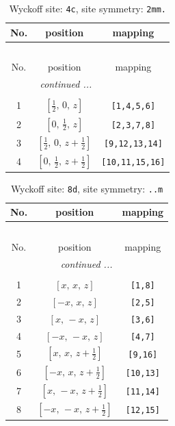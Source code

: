 \documentclass[fleqn,8pt]{jsarticle}
\begin{document}
\renewcommand{\arraystretch}{1.2}
\begin{longtable}{ccc}
\caption{Wyckoff site: {\tt 4c}, site symmetry: {\tt 2mm.}}
 \\
 \hline \hline
No. & position & mapping \\ \hline \endfirsthead

\multicolumn{2}{l}{\tablename\ \thetable{}} \\
 \hline \hline
No. & position & mapping \\ \hline \endhead

 \hline \hline
\multicolumn{2}{r}{\footnotesize\it continued ...} \\ \endfoot

 \hline \hline
\multicolumn{2}{r}{} \\ \endlastfoot

1 & $\left[ \frac{1}{2},\, 0,\, z \right]$ & {\tt [1,4,5,6]} \\ \hline
2 & $\left[ 0,\, \frac{1}{2},\, z \right]$ & {\tt [2,3,7,8]} \\ \hline
3 & $\left[ \frac{1}{2},\, 0,\, z + \frac{1}{2} \right]$ & {\tt [9,12,13,14]} \\ \hline
4 & $\left[ 0,\, \frac{1}{2},\, z + \frac{1}{2} \right]$ & {\tt [10,11,15,16]} \\
\end{longtable}
\renewcommand{\arraystretch}{1.2}
\begin{longtable}{ccc}
\caption{Wyckoff site: {\tt 8d}, site symmetry: {\tt ..m}}
 \\
 \hline \hline
No. & position & mapping \\ \hline \endfirsthead

\multicolumn{2}{l}{\tablename\ \thetable{}} \\
 \hline \hline
No. & position & mapping \\ \hline \endhead

 \hline \hline
\multicolumn{2}{r}{\footnotesize\it continued ...} \\ \endfoot

 \hline \hline
\multicolumn{2}{r}{} \\ \endlastfoot

1 & $\left[ x,\, x,\, z \right]$ & {\tt [1,8]} \\ \hline
2 & $\left[ - x,\, x,\, z \right]$ & {\tt [2,5]} \\ \hline
3 & $\left[ x,\, - x,\, z \right]$ & {\tt [3,6]} \\ \hline
4 & $\left[ - x,\, - x,\, z \right]$ & {\tt [4,7]} \\ \hline
5 & $\left[ x,\, x,\, z + \frac{1}{2} \right]$ & {\tt [9,16]} \\ \hline
6 & $\left[ - x,\, x,\, z + \frac{1}{2} \right]$ & {\tt [10,13]} \\ \hline
7 & $\left[ x,\, - x,\, z + \frac{1}{2} \right]$ & {\tt [11,14]} \\ \hline
8 & $\left[ - x,\, - x,\, z + \frac{1}{2} \right]$ & {\tt [12,15]} \\
\end{longtable}
\end{document}
